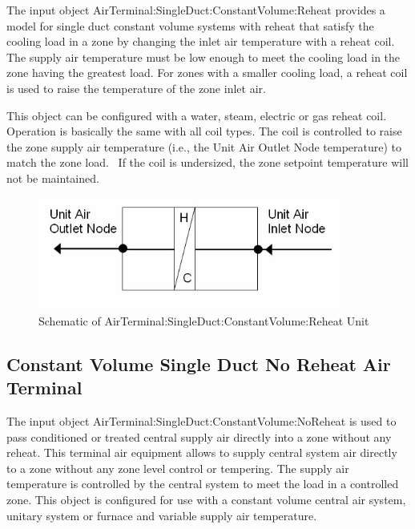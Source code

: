 The input object AirTerminal:SingleDuct:ConstantVolume:Reheat provides a model for single duct constant volume systems with reheat that satisfy the cooling load in a zone by changing the inlet air temperature with a reheat coil. The supply air temperature must be low enough to meet the cooling load in the zone having the greatest load. For zones with a smaller cooling load, a reheat coil is used to raise the temperature of the zone inlet air.

This object can be configured with a water, steam, electric or gas reheat coil. Operation is basically the same with all coil types. The coil is controlled to raise the zone supply air temperature (i.e., the Unit Air Outlet Node temperature) to match the zone load.~ If the coil is undersized, the zone setpoint temperature will not be maintained.

\begin{figure}[hbtp] %
\centering
\includegraphics[width=0.9\textwidth, height=0.9\textheight, keepaspectratio=true]{media/image2788.png}
\caption{Schematic of AirTerminal:SingleDuct:ConstantVolume:Reheat Unit \protect \label{fig:schematic-of-airterminal-singleduct}}
\end{figure}


\subsection{Constant Volume Single Duct No Reheat Air Terminal}\label{constant-volume-single-duct-no-reheat-air-terminal}

The input object AirTerminal:SingleDuct:ConstantVolume:NoReheat is used to pass conditioned or treated central supply air directly into a zone without any reheat. This terminal air equipment allows to supply central system air directly to a zone without any zone level control or tempering. The supply air temperature is controlled by the central system to meet the load in a controlled zone. This object is configured for use with a constant volume central air system, unitary system or furnace and variable supply air temperature. 


